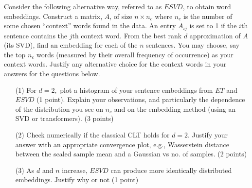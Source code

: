 \documentclass[12pt]{article}
\begin{document}
Consider the following alternative way, referred to as $ESVD$, to obtain word embeddings. Construct a matrix, $A$, of size $n \times n_c$ where 
$n_c$ is the number of some chosen ``context'' words found in the data. An entry $A_{ij}$ is set to 1 if the $i$th sentence contains the $j$th context word. 
From the best rank $d$ approximation of $A$ (its SVD), find an embedding for each of the $n$ sentences.
You may choose, say the top $n_c$ words (measured by their overall frequency of occurrence) as your context words. Justify any alternative choice for the context words 
in your answers for the questions below.
\begin{itemize}
\item[(1)] For $d = 2,$ plot a histogram of your sentence embeddings from $ET$ and $ESVD$ (1 point). Explain your observations, and particularly the dependence of the distribution 
 you see on $n_c$ and on the embedding method (using an SVD or transformers). (3 points)
\item[(2)] Check numerically if the classical CLT holds for $d=2$. Justify your answer with an appropriate convergence plot, e.g., Wasserstein distance between the scaled sample mean and a Gaussian vs no. of samples. (2 points)
\item[(3)] As $d$ and $n$ increase, $ESVD$ can produce more identically distributed embeddings. Justify why or not (1 point)  
\end{itemize}
\end{document}

